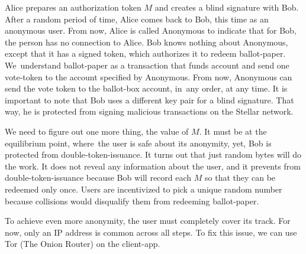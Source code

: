 \documentclass[applsci,article,accept,moreauthors,pdftex]{Definitions/mdpi}
\begin{document}
Alice prepares an authorization token $M$ and creates a blind signature with Bob. After a random period of time, Alice comes back to Bob, this time as an anonymous user. From now, Alice is called  {Anonymous} to indicate that for Bob, the person has no connection to Alice. Bob knows nothing about Anonymous, except that it has a signed token, which authorizes it to redeem ballot-paper. We~understand ballot-paper as a transaction that funds account and send one vote-token to the account specified by Anonymous. From now, Anonymous can send the vote token to the ballot-box account, in~any order, at any time.
It is important to note that Bob uses a different key pair for a blind signature. That way, he is protected from signing malicious transactions on the Stellar network. 

We need to figure out one more thing, the value of $M$. It must be at the equilibrium point, where~the user is safe about its anonymity, yet, Bob is protected from double-token-issuance. It turns out that just random bytes will do the work. It does not reveal any information about the user, and it prevents from double-token-issuance because Bob will record each $M$ so that they can be redeemed only once. Users are incentivized to pick a unique random number because collisions would disqualify them from redeeming ballot-paper.

To achieve even more anonymity, the user must completely cover its track. For now, only an IP address is common across all steps. To fix this issue, we can use Tor (The Onion Router) on the client-app. 
\end{document}
